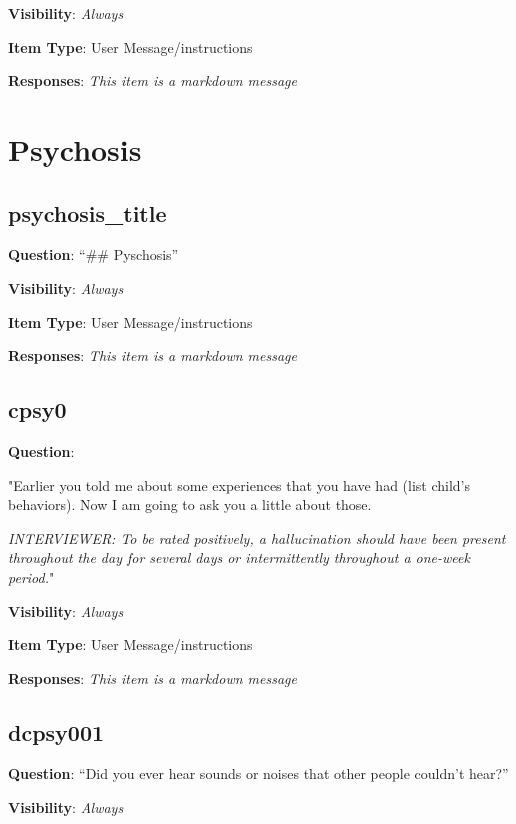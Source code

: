 \documentclass[]{book}
\begin{document}
\textbf{Visibility}: \emph{Always}

\textbf{Item Type}: User Message/instructions

\textbf{Responses}: \emph{This item is a markdown message}

\hypertarget{activity_section}{%
\chapter{Psychosis}\label{activity_section}}

\hypertarget{psychosis_title}{%
\section{psychosis\_title}\label{psychosis_title}}

\textbf{Question}: ``\#\# Pyschosis''

\textbf{Visibility}: \emph{Always}

\textbf{Item Type}: User Message/instructions

\textbf{Responses}: \emph{This item is a markdown message}

\hypertarget{cpsy0}{%
\section{cpsy0}\label{cpsy0}}

\textbf{Question}:

"Earlier you told me about some experiences that you have had (list child's behaviors). Now I am going to ask you a little about those.

\emph{INTERVIEWER: To be rated positively, a hallucination should have been present throughout the day for several days or intermittently throughout a one-week period.}"

\textbf{Visibility}: \emph{Always}

\textbf{Item Type}: User Message/instructions

\textbf{Responses}: \emph{This item is a markdown message}

\hypertarget{dcpsy001}{%
\section{dcpsy001}\label{dcpsy001}}

\textbf{Question}: ``Did you ever hear sounds or noises that other people couldn't hear?''

\textbf{Visibility}: \emph{Always}
\end{document}
